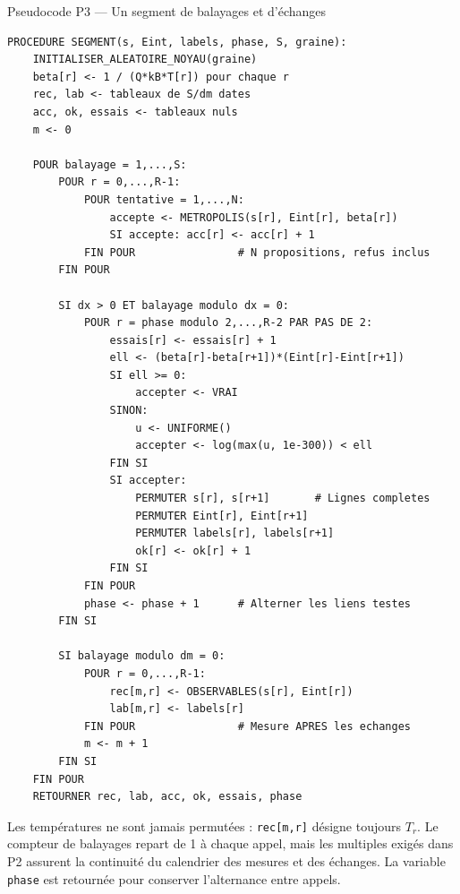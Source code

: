 \documentclass[10pt,a4paper]{article}
\begin{document}
\begin{algocode}{Pseudocode P3 --- Un segment de balayages et d'échanges}
\small
\begin{verbatim}
PROCEDURE SEGMENT(s, Eint, labels, phase, S, graine):
    INITIALISER_ALEATOIRE_NOYAU(graine)
    beta[r] <- 1 / (Q*kB*T[r]) pour chaque r
    rec, lab <- tableaux de S/dm dates
    acc, ok, essais <- tableaux nuls
    m <- 0

    POUR balayage = 1,...,S:
        POUR r = 0,...,R-1:
            POUR tentative = 1,...,N:
                accepte <- METROPOLIS(s[r], Eint[r], beta[r])
                SI accepte: acc[r] <- acc[r] + 1
            FIN POUR                # N propositions, refus inclus
        FIN POUR

        SI dx > 0 ET balayage modulo dx = 0:
            POUR r = phase modulo 2,...,R-2 PAR PAS DE 2:
                essais[r] <- essais[r] + 1
                ell <- (beta[r]-beta[r+1])*(Eint[r]-Eint[r+1])
                SI ell >= 0:
                    accepter <- VRAI
                SINON:
                    u <- UNIFORME()
                    accepter <- log(max(u, 1e-300)) < ell
                FIN SI
                SI accepter:
                    PERMUTER s[r], s[r+1]       # Lignes completes
                    PERMUTER Eint[r], Eint[r+1]
                    PERMUTER labels[r], labels[r+1]
                    ok[r] <- ok[r] + 1
                FIN SI
            FIN POUR
            phase <- phase + 1      # Alterner les liens testes
        FIN SI

        SI balayage modulo dm = 0:
            POUR r = 0,...,R-1:
                rec[m,r] <- OBSERVABLES(s[r], Eint[r])
                lab[m,r] <- labels[r]
            FIN POUR                # Mesure APRES les echanges
            m <- m + 1
        FIN SI
    FIN POUR
    RETOURNER rec, lab, acc, ok, essais, phase
\end{verbatim}
\end{algocode}

Les températures ne sont jamais permutées : \texttt{rec[m,r]} désigne
toujours $T_r$. Le compteur de balayages repart de 1 à chaque appel, mais
les multiples exigés dans P2 assurent la continuité du calendrier des
mesures et des échanges. La variable \texttt{phase} est retournée pour
conserver l'alternance entre appels.
\end{document}
